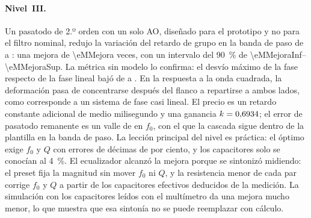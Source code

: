 \paragraph{Nivel~III.} Un pasatodo de 2.º orden con un solo AO, diseñado para el prototipo y no para el filtro nominal, redujo la variación del
retardo de grupo en la banda de paso de  a : una mejora de \num{\eMMejora} veces,
con un intervalo del \qty{90}{\percent} de \numrange{\eMMejoraInf}{\eMMejoraSup}. La métrica sin modelo lo confirma: el desvío máximo de la fase
respecto de la fase lineal bajó de  a . En la respuesta a la onda cuadrada, la
deformación pasa de concentrarse después del flanco a repartirse a ambos lados, como corresponde a un sistema de fase casi lineal. El precio es un
retardo constante adicional de medio milisegundo y una ganancia $k = \num{0.6934}$; el error de pasatodo remanente es un valle de
 en $f_0$, con el que la cascada sigue dentro de la plantilla en la banda de paso. La lección principal del nivel es práctica: el óptimo exige $f_0$ y $Q$ con errores de décimas de por ciento, y los
capacitores solo se conocían al \qty{4}{\percent}. El ecualizador alcanzó la mejora porque se sintonizó midiendo: el preset fija la magnitud sin
mover $f_0$ ni $Q$, y la resistencia menor de cada par corrige $f_0$ y $Q$ a partir de los capacitores efectivos deducidos de la medición. La
simulación con los capacitores leídos con el multímetro da una mejora mucho menor, lo que muestra que esa sintonía no se puede reemplazar con
cálculo.

